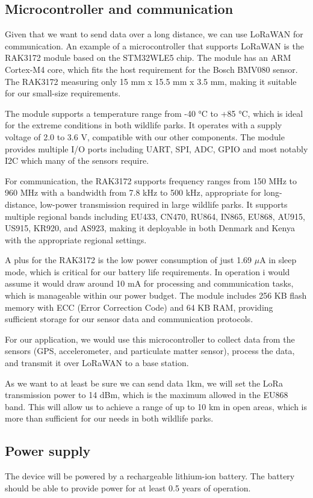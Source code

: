 \subsection{Microcontroller and communication}
Given that we want to send data over a long distance, we can use LoRaWAN for communication. An example of a microcontroller that supports LoRaWAN is the RAK3172 module based on the STM32WLE5 chip\cite{rak3172_datasheet}. The module has an ARM Cortex-M4 core, which fits the host requirement for the Bosch BMV080 sensor. The RAK3172 measuring only 15 mm x 15.5 mm x 3.5 mm, making it suitable for our small-size requirements.

The module supports a temperature range from -40 °C to +85 °C, which is ideal for the extreme conditions in both wildlife parks. It operates with a supply voltage of 2.0 to 3.6 V, compatible with our other components. The module provides multiple I/O ports including UART, SPI, ADC, GPIO and most notably I2C which many of the sensors require.

For communication, the RAK3172 supports frequency ranges from 150 MHz to 960 MHz with a bandwidth from 7.8 kHz to 500 kHz, appropriate for long-distance, low-power transmission required in large wildlife parks. It supports multiple regional bands including EU433, CN470, RU864, IN865, EU868, AU915, US915, KR920, and AS923, making it deployable in both Denmark and Kenya with the appropriate regional settings.

A plus for the RAK3172 is the low power consumption of just 1.69 $\mu$A in sleep mode, which is critical for our battery life requirements. In operation i would assume it would draw around 10 mA for processing and communication tasks, which is manageable within our power budget. The module includes 256 KB flash memory with ECC (Error Correction Code) and 64 KB RAM, providing sufficient storage for our sensor data and communication protocols.

For our application, we would use this microcontroller to collect data from the sensors (GPS, accelerometer, and particulate matter sensor), process the data, and transmit it over LoRaWAN to a base station.

As we want to at least be sure we can send data 1km, we will set the LoRa transmission power to 14 dBm, which is the maximum allowed in the EU868 band. This will allow us to achieve a range of up to 10 km in open areas, which is more than sufficient for our needs in both wildlife parks.

\subsection{Power supply}
The device will be powered by a rechargeable lithium-ion battery. The battery should be able to provide power for at least 0.5 years of operation.

